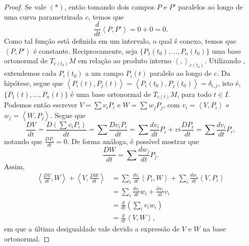 \begin{proposition}
\begin{proof}
        Se vale $(*)$, então tomando dois campos $P$ e $P'$ paralelos ao longo de uma curva parametrizada $c$, temos que
        \begin{equation*}
            \frac{d}{dt}\left<P,P'\right>=0+0 = 0.
        \end{equation*}
        Como tal função está definida em um intervalo, o qual é conexo, temos que $\left<P,P'\right>$ é constante.
        Reciprocamente, seja $\{ P_{1}(t_{0}), \dots, P_{n}(t_{0}) \}$ uma base ortonormal de $T_{c(t_{0})}M$ em relação ao produto interno $\left<,\right>_{c(t_{0})}$.
        Utilizando , extendemos cada $P_{i}(t_{0})$ a um campo $P_{i}(t)$ paralelo ao longo de $c$.
        Da hipótese, segue que $\left<P_{i}(t),P_{j}(t)\right>=\left<P_{i}(t_{0}),P_{j}(t_{0})\right>=\delta_{i,j}$, isto é, $\{ P_{1}(t), \dots, P_{n}(t) \}$ é uma base ortonormal de $T_{c(t)}M$, para todo $t \in I$.
        Podemos então escrever $V=\sum v_{i}P_{i}$ e $W=\sum w_{j}P_{j}$, com $v_{i}=\left<V,P_{i}\right>$ e $w_{j}=\left<W,P_{j}\right>$.
        Segue que
        \begin{equation*}
            \frac{DV}{dt}=\frac{D\left( \sum v_{i}P_{i} \right)}{dt}=\sum\frac{Dv_{i}P_{i}}{dt}=\sum \frac{dv_{i}}{dt}P_{i}+vi\frac{DP_{i}}{dt} = \sum\frac{dv_{i}}{dt}P_{i},
        \end{equation*}
        notando que $\frac{DP_{i}}{dt}=0$.
        De forma análoga, é possível mostrar que
        \begin{equation*}
            \frac{DW}{dt}=\sum\frac{dw_{j}}{dt}P_{j}.
        \end{equation*}
        Assim,
        \begin{align*}
            \left<\frac{DV}{dt},W\right> + \left<V,\frac{DW}{dt}\right> & = \sum_{i}\frac{dv_{i}}{dt}\left<P_{i},W\right> + \sum_{i}\frac{dw_{i}}{dt}\left<V,P_{i}\right> \\
                                                                        & = \sum_{i} \frac{dv_{i}}{dt}w_{i} + \frac{dw_{i}}{dt}v_{i}                                      \\
                                                                        & = \frac{d}{dt}\left( \sum_{i}v_{i}w_{i} \right)                                                 \\
                                                                        & = \frac{d}{dt}\left<V,W\right>  ,
        \end{align*}
        em que a última desigualdade vale devido a expressão de $V$ e $W$ na base ortonormal.
    \end{proof}
\end{proposition}

